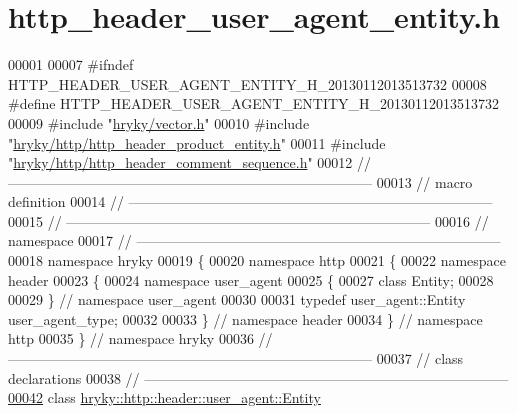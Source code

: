\hypertarget{http__header__user__agent__entity_8h_source}{\section{http\-\_\-header\-\_\-user\-\_\-agent\-\_\-entity.\-h}
}

\begin{DoxyCode}
00001 
00007 \textcolor{preprocessor}{#ifndef HTTP\_HEADER\_USER\_AGENT\_ENTITY\_H\_20130112013513732}
00008 \textcolor{preprocessor}{}\textcolor{preprocessor}{#define HTTP\_HEADER\_USER\_AGENT\_ENTITY\_H\_20130112013513732}
00009 \textcolor{preprocessor}{}\textcolor{preprocessor}{#include "\hyperlink{vector_8h}{hryky/vector.h}"}
00010 \textcolor{preprocessor}{#include "\hyperlink{http__header__product__entity_8h}{hryky/http/http_header_product_entity.h}"}
00011 \textcolor{preprocessor}{#include "\hyperlink{http__header__comment__sequence_8h}{hryky/http/http_header_comment_sequence.h}"}
00012 \textcolor{comment}{//
      ------------------------------------------------------------------------------}
00013 \textcolor{comment}{// macro definition}
00014 \textcolor{comment}{//
      ------------------------------------------------------------------------------}
00015 \textcolor{comment}{//
      ------------------------------------------------------------------------------}
00016 \textcolor{comment}{// namespace}
00017 \textcolor{comment}{//
      ------------------------------------------------------------------------------}
00018 \textcolor{keyword}{namespace }hryky
00019 \{
00020 \textcolor{keyword}{namespace }http
00021 \{
00022 \textcolor{keyword}{namespace }header
00023 \{
00024 \textcolor{keyword}{namespace }user\_agent
00025 \{
00027     \textcolor{keyword}{class }Entity;
00028 
00029 \} \textcolor{comment}{// namespace user\_agent}
00030 
00031 \textcolor{keyword}{typedef} user\_agent::Entity user\_agent\_type;
00032 
00033 \} \textcolor{comment}{// namespace header}
00034 \} \textcolor{comment}{// namespace http}
00035 \} \textcolor{comment}{// namespace hryky}
00036 \textcolor{comment}{//
      ------------------------------------------------------------------------------}
00037 \textcolor{comment}{// class declarations}
00038 \textcolor{comment}{//
      ------------------------------------------------------------------------------}
\hypertarget{http__header__user__agent__entity_8h_source_l00042}{}\hyperlink{classhryky_1_1http_1_1header_1_1user__agent_1_1_entity}{00042} \textcolor{comment}{}\textcolor{keyword}{class }\hyperlink{classhryky_1_1http_1_1header_1_1user__agent_1_1_entity}{hryky::http::header::user_agent::Entity}

\end{DoxyCode}
